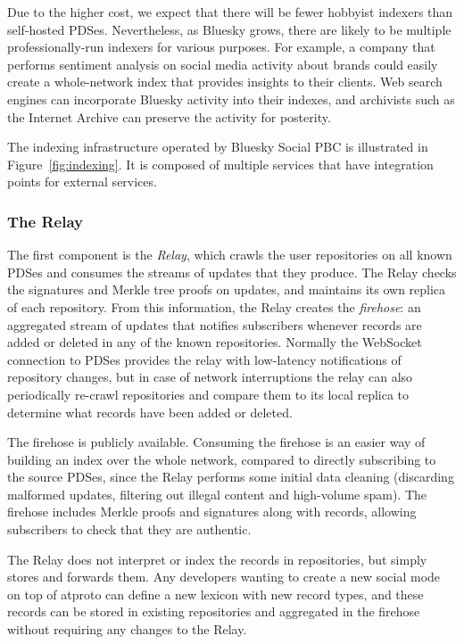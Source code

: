 \documentclass[sigconf]{acmart}
\begin{document}
Due to the higher cost, we expect that there will be fewer hobbyist indexers than self-hosted PDSes.
Nevertheless, as Bluesky grows, there are likely to be multiple professionally-run indexers for various purposes.
For example, a company that performs sentiment analysis on social media activity about brands could easily create a whole-network index that provides insights to their clients.
Web search engines can incorporate Bluesky activity into their indexes, and archivists such as the Internet Archive can preserve the activity for posterity.

The indexing infrastructure operated by Bluesky Social PBC is illustrated in Figure~\ref{fig:indexing}.
It is composed of multiple services that have integration points for external services.

\subsubsection{The Relay}\label{sec:relay}

The first component is the \emph{Relay}, which crawls the user repositories on all known PDSes and consumes the streams of updates that they produce.
The Relay checks the signatures and Merkle tree proofs on updates, and maintains its own replica of each repository.
From this information, the Relay creates the \emph{firehose}: an aggregated stream of updates that notifies subscribers whenever records are added or deleted in any of the known repositories.
Normally the WebSocket connection to PDSes provides the relay with low-latency notifications of repository changes, but in case of network interruptions the relay can also periodically re-crawl repositories and compare them to its local replica to determine what records have been added or deleted.

The firehose is publicly available.
Consuming the firehose is an easier way of building an index over the whole network, compared to directly subscribing to the source PDSes, since the Relay performs some initial data cleaning (discarding malformed updates, filtering out illegal content and high-volume spam).
The firehose includes Merkle proofs and signatures along with records, allowing subscribers to check that they are authentic.

The Relay does not interpret or index the records in repositories, but simply stores and forwards them.
Any developers wanting to create a new social mode on top of atproto can define a new lexicon with new record types, and these records can be stored in existing repositories and aggregated in the firehose without requiring any changes to the Relay.
\end{document}
